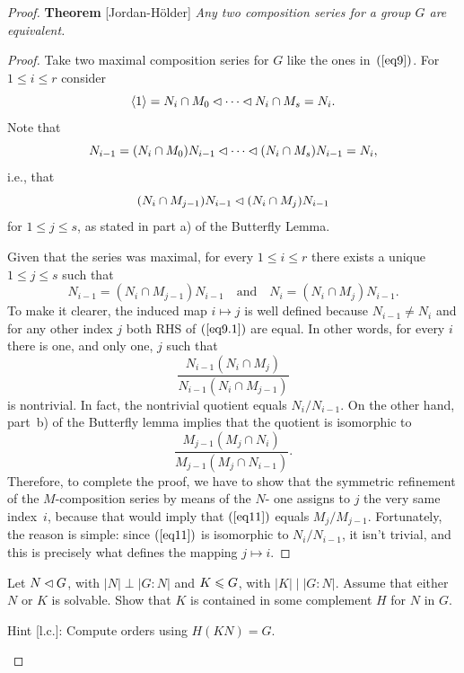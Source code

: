 \begin{proof}
\medskip

\textbf{Theorem} [Jordan-H\"older] \textit{Any two composition series for a group\/ $G$ are equivalent.}

\begin{proof} Take two maximal composition series for $G$ like the ones in~$(\ref{eq9})$. For $1\le i\le r$ consider
$$
    \langle1\rangle=N_i\cap M_0\lhd\cdots\lhd N_i\cap M_s=N_i.
$$
Note that
$$
    N_{i-1}=(N_i\cap M_0)N_{i-1}\lhd
        \cdots\lhd(N_i\cap M_s)N_{i-1}=N_i,
$$
i.e., that
$$
    (N_i\cap M_{j-1})N_{i-1}\lhd (N_i\cap M_j)N_{i-1}
$$
for $1\le j\le s$, as stated in part a) of the Butterfly Lemma.

Given that the series was maximal, for every $1\le i\le r$ there exists a unique $1\le j\le s$ such that
\begin{equation}\label{eq9.1}
    N_{i-1} = (N_i\cap M_{j-1})N_{i-1}\quad\text{and}\quad
        N_i = (N_i\cap M_j)N_{i-1}.
\end{equation}
To make it clearer, the induced map $i\mapsto j$ is well defined because $N_{i-1}\ne N_i$ and for any other index $j$ both RHS of $(\ref{eq9.1})$ are equal. In other words, for every $i$ there is one, and only one, $j$ such that
$$
    \frac{N_{i-1}(N_i\cap M_j)}{N_{i-1}(N_i\cap M_{j-1})}
$$
is nontrivial. In fact, the nontrivial quotient equals $N_i/N_{i-1}$. On the other hand, part~b) of the Butterfly lemma implies that the quotient is isomorphic to
\begin{equation}\label{eq11}
    \frac{M_{j-1}(M_j\cap N_i)}{M_{j-1}(M_j\cap N_{i-1})}.
\end{equation}
Therefore, to complete the proof, we have to show that the symmetric refinement of the $M$-composition series by means of the $N$- one assigns to $j$ the very same index~$i$, because that would imply that $(\ref{eq11})$ equals $M_j/M_{j-1}$. Fortunately, the reason is simple: since $(\ref{eq11})$ is isomorphic to $N_i/N_{i-1}$, it isn't trivial, and this is precisely what defines the mapping $j\mapsto i$.  \end{proof}

\begin{probl}\label{problem-3.B.4}
    Let\/ $N\lhd G$, with\/ $|N|\perp|G:N|$ and\/ $K \leqslant G$, with\/ $|K|\mid|G:N|$. Assume that either\/ $N$ or\/ $K$ is solvable. Show that\/ $K$ is contained in some complement\/ $H$ for\/ $N$ in\/ $G$.

    {\upshape Hint [l.c.]: Compute orders using $H(KN)=G$.}
\end{probl}


\end{proof}
